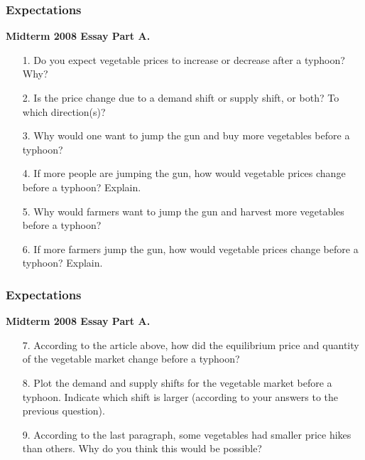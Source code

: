 \documentclass[12pt, xcolor=dvipsnames]{beamer}
\begin{document}
\begin{frame}
\frametitle{\bf Expectations}
\small \textsf{\bfseries Midterm 2008 Essay Part A.} 
\begin{enumerate}\itemsep-0.5ex
\item [1.] Do you expect vegetable prices to increase or decrease after a typhoon? Why?
\item [2.]  Is the price change due to a demand shift or supply shift, or both? To which direction(s)?
\item [3.]  Why would one want to jump the gun and buy more vegetables before a typhoon?
\item [4.]  If more people are jumping the gun, how would vegetable prices change before a
typhoon? Explain.
\item [5.]  Why would farmers want to jump the gun and harvest more vegetables before a
typhoon?
\item [6.]  If more farmers jump the gun, how would vegetable prices change before a typhoon?
Explain.
\end{enumerate}
\end{frame}


\begin{frame}
\frametitle{\bf Expectations}
\small \textsf{\bfseries Midterm 2008 Essay Part A.} 
\begin{enumerate}\itemsep-0.5ex
\item [7.]  According to the article above, how did the equilibrium price and quantity of the
vegetable market change before a typhoon?
\item [8.]  Plot the demand and supply shifts for the vegetable market before a typhoon. Indicate
which shift is larger (according to your answers to the previous question).
\item [9.]  According to the last paragraph, some vegetables had smaller price hikes than others.
Why do you think this would be possible?
\end{enumerate}
\end{frame}
\end{document}
